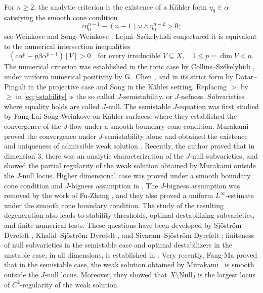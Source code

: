 \documentclass[reqno]{amsart}
\numberwithin{equation}{section}
\theoremstyle{definition}
\begin{document}
For $n\ge2$, the analytic criterion is the existence of a K\"ahler
form $\eta_0\in\alpha$ satisfying the smooth cone condition
\[
 c\eta_0^{n-1}-(n-1)\omega\wedge\eta_0^{n-2}>0;
\]
see Weinkove \cite{W04,W06} and Song--Weinkove \cite{SW08}.
Lejmi--Sz\'ekelyhidi \cite{LS15} conjectured it is equivalent to the numerical intersection inequalities
\begin{equation}\label{eq:j-stability}
 (c\alpha^p-p\beta\alpha^{p-1})[V]>0
 \quad\text{for every irreducible }V\subsetneq X,\quad
 1\le p=\dim V<n.
\end{equation}
The numerical criterion was established in the toric case by
Collins--Sz\'ekelyhidi \cite{CS17}, under uniform numerical
positivity by G.~Chen \cite{C21}, and in its strict form by
Datar--Pingali \cite{DP21} in the projective case and Song
\cite{S20} in the K\"ahler setting. Replacing $>$ by $\ge$
in \eqref{eq:j-stability} is the so called
$J$-semistability, or $J$-nefness. Subvarieties where
equality holds are called $J$-null. The semistable $J$-equation was first studied by Fang-Lai-Song-Weinkove \cite{FLSW14} on K\'ahler surfaces, where they established the convergence of the $J$-flow under a smooth boundary cone condition. Murakami proved the convergence under $J$-semistability alone and obtained the existence and uniqueness of admissible weak solution \cite{M26a,M26b}. Recently, the author \cite{L26a} proved that in dimension $3$, there was an analytic characterization of the $J$-null subvarieties, and showed the partial regularity of the weak solution obtained by Murakami outside the $J$-null locus. Higher dimensional case was proved under a smooth boundary cone condition and $J$-bigness assumption in \cite{L26b}. The $J$-bigness assumption was removed by the work of Fu-Zhang \cite{FZ26}, and they also proved a uniform $L^\infty$-estimate under the smooth cone boundary condition. 
The study of the resulting
degeneration also leads to stability thresholds, optimal
destabilizing subvarieties, and finite numerical tests. These
questions have been developed by Sj\"ostr\"om Dyrefelt \cite{SD20},
Khalid--Sj\"ostr\"om Dyrefelt \cite{KD24,KD26}, and
Sivaram--Sj\"ostr\"om Dyrefelt \cite{SSD26}; finiteness of null
subvarieties in the semistable case and optimal destabilizers
in the unstable case, in all dimensions, is established in
\cite{L26c}. Very recently, Fang-Ma \cite{FM26} proved that in the semistable case, the weak solution obtained by Murakami~\cite{M26b} is smooth outside the $J$-null locus. Moreover, they showed that $X\setminus \text{Null}_J$ is the largest locus of $C^2$-regularity of the weak solution. 
\end{document}
